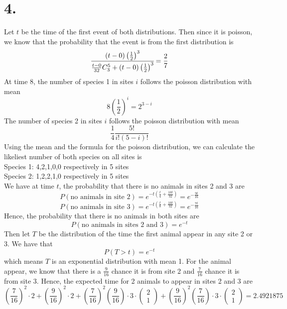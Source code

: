 \documentclass[11pt]{article}
\begin{document}
\section*{4.}
Let $t$ be the time of the first event of both distributions. Then since it is poisson, we know 
that the probability that the event is from the first distribution is 
\[
    \cfrac{(t-0)\left(\frac{1}{2}\right)^3}{\frac{t-0}{32} C^5_3 + (t-0)\left(\frac{1}{2}\right)^3} = \frac{2}{7}     
\]
At time 8, the number of species 1 in sites $i$ follows the poisson distribution with mean 
\[
    8 \left(\frac{1}{2}\right)^i = 2^{3-i}  
\]
The number of species 2 in sites $i$ follows the poisson distribution with mean 
\[
    \frac{1}{4} \frac{5!}{i!(5-i)!}
\]
Using the mean and the formula for the poisson distribution, we can calculate the likeliest 
number of both species on all sites is \\ 
Species 1: 4,2,1,0,0 respectively in 5 sites \\
Species 2: 1,2,2,1,0 respectively in 5 sites \\
We have at time $t$, the probability that there is no animals in sites 2 and 3 are 
\[
    P(\text{no animals in site 2}) = e^{-t\left(\frac{t}{4} + \frac{10t}{32}\right)} = e^{-\frac{9t}{16}}
\]
\[
    P(\text{no animals in site 3}) = e^{-t\left(\frac{t}{8} + \frac{10t}{32}\right)} = e^{-\frac{7t}{16}}
\]
Hence, the probability that there is no animals in both sites are 
\[
    P(\text{no animals in sites 2 and 3}) = e^{-t}    
\]
Then let $T$ be the distribution of the time the first animal appear in any site 2 or 3.
We have that 
\[
    P(T>t) = e^{-t}    
\]
which means $T$ is an exponential distribution with mean 1. For the animal appear, we know that
there is a $\frac{9}{16}$ chance it is from site 2 and $\frac{7}{16}$ chance it is from site 3. 
Hence, the expected time for 2 animals to appear in sites 2 and 3 are 
\[
    \left(\frac{7}{16}\right)^2 \cdot 2 + \left(\frac{9}{16}\right)^2 \cdot 2 
    + \left(\frac{7}{16}\right)^2 \left(\frac{9}{16}\right) \cdot 3 \cdot 
    \begin{pmatrix}
        2 \\
        1
    \end{pmatrix} 
    + \left(\frac{9}{16}\right)^2 \left(\frac{7}{16}\right) \cdot 3 \cdot 
    \begin{pmatrix}
        2 \\
        1
    \end{pmatrix} = 2.4921875
\]
\end{document}

